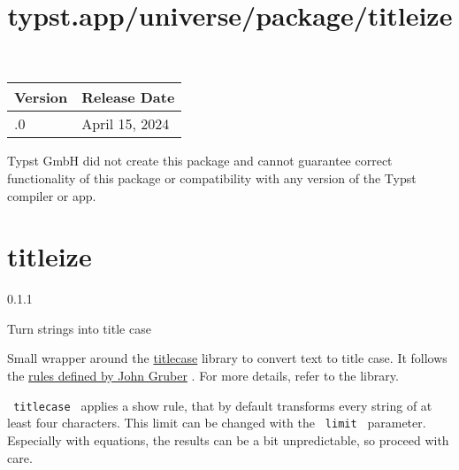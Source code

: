 \begin{longtable}[]{@{}ll@{}}
\toprule\noalign{}
Version & Release Date \\
\midrule\noalign{}
\endhead
\bottomrule\noalign{}
\endlastfoot
0.1.0 & April 15, 2024 \\
\end{longtable}

Typst GmbH did not create this package and cannot guarantee correct
functionality of this package or compatibility with any version of the
Typst compiler or app.


\title{typst.app/universe/package/titleize}

\label{banner}
\section{titleize}\label{titleize}

{ 0.1.1 }

Turn strings into title case

\label{readme}
Small wrapper around the
\href{https://crates.io/crates/titlecase}{titlecase} library to convert
text to title case. It follows the
\href{https://daringfireball.net/2008/05/title_case}{rules defined by
John Gruber} . For more details, refer to the library.

\texttt{\ titlecase\ } applies a show rule, that by default transforms
every string of at least four characters. This limit can be changed with
the \texttt{\ limit\ } parameter. Especially with equations, the results
can be a bit unpredictable, so proceed with care.

